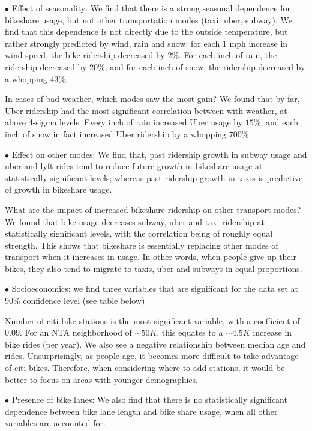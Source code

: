 \documentclass[12pt]{article}
\begin{document}
$\bullet$ Effect of seasonality: We find that there is a strong seasonal dependence for bikeshare usage, but not other transportation modes (taxi, uber, subway). We find that this dependence is not directly due to the outside temperature, but rather strongly predicted by wind, rain and snow: for each 1 mph increase in wind speed, the bike ridership decreased by 2\%. For each inch of rain, the ridership decreased by 20\%, and for each inch of snow, the ridership decreased by a whopping 43\%.

In cases of bad weather, which modes saw the most gain? We found that by far, Uber ridership had the most significant correlation between with weather, at above 4-sigma levels. Every inch of rain increased Uber usage by $15\%$, and each inch of snow in fact increased Uber ridership by a whopping $700\%$. 

$\bullet$ Effect on other modes: We find that, past ridership growth in subway usage and uber and lyft rides tend to reduce future growth in bikeshare usage at statistically significant levels; whereas past ridership growth in taxis is predictive of growth in bikeshare usage.

What are the impact of increased bikeshare ridership on other transport modes? We found that bike usage decreases subway, uber and taxi ridership at statistically significant levels, with the correlation being of roughly equal strength. This shows that bikeshare is essentially replacing other modes of transport when it increases in usage. In other words, when people give up their bikes, they also tend to migrate to taxis, uber and subways in equal proportions.

\newpage
$\bullet$ Socioeconomics: we find three variables that are significant for the data set at 90\% confidence level (see table below)
\par Number of citi bike stations is the most significant variable, with a coefficient of $0.09$. For an NTA neighborhood of $\sim 50K$, this equates to a $\sim 4.5K$ increase in bike rides (per year). We also see a negative relationship between median age and rides. Unsurprisingly, as people age, it becomes more difficult to take advantage of citi bikes. Therefore, when considering where to add stations, it would be better to focus on areas with younger demographics.

$\bullet$ Presence of bike lanes: We also find that there is no statistically significant dependence between bike lane length and bike share usage, when all other variables are accounted for.
\end{document}
